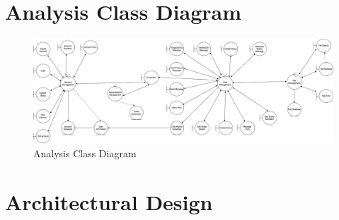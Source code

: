 \documentclass[]{article}
\begin{document}


\section{Analysis Class Diagram}
\label{sec:analysis_class_diagram}
\begin{figure}[H]
	\centering
	\includegraphics[width=1\textwidth]{d2_analysis_class.jpg}
	\caption{Analysis Class Diagram}
\end{figure}


\section{Architectural Design}
\label{sec:architectural_design}
\end{document}
